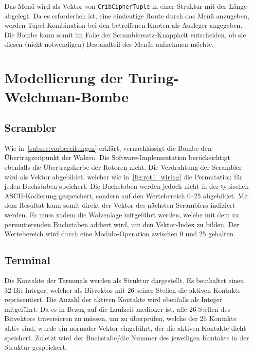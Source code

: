 Das Menü wird als Vektor von \texttt{CribCipherTuple} in einer Struktur mit der Länge abgelegt.
Da es erforderlich ist, eine eindeutige \glqq Route\grqq{} durch das Menü anzugeben, werden Tupel-Kombination bei den betroffenen Knoten als Ausleger angegeben. 
Die Bombe kann somit im Falle der \glqq Scramblersatz-Knappheit\grqq{} entscheiden, ob sie diesen (nicht notwendigen) Bestandteil des Menüs aufnehmen möchte.

\section{Modellierung der Turing-Welchman-Bombe}\label{sec:model}
\subsection{Scrambler}\label{subsec:impl_scrambler}
Wie in~\cref{subsec:vorbereitungen} erklärt, vernachlässigt die Bombe den Übertragzeitpunkt der Walzen.
Die Software-Implementation berücksichtigt ebenfalls die Übertragskerbe der Rotoren nicht.
Die Verdrahtung der Scrambler wird als Vektor abgebildet, welcher wie in~\cref{fig:rot1_wiring} die Permutation für jeden Buchstaben speichert.
Die Buchstaben werden jedoch nicht in der typischen ASCII-Kodierung gespeichert, sondern auf den Wertebereich 0--25 abgebildet.
Mit dem Resultat kann somit direkt der Vektor des nächsten Scramblers indiziert werden.
Es muss zudem die Walzenlage mitgeführt werden, welche mit dem zu permutierenden Buchstaben addiert wird, um den Vektor-Index zu bilden.
Der Wertebereich wird durch eine Modulo-Operation zwischen 0 und 25 gehalten.

\subsection{Terminal}\label{subsec:impl_terminal}
Die Kontakte der Terminals werden als Struktur dargestellt.
Es beinhaltet einen 32 Bit Integer, welcher als Bitvektor mit 26 seiner Stellen die aktiven Kontakte repräsentiert.
Die Anzahl der aktiven Kontakte wird ebenfalls als Integer mitgeführt.
Da es in Bezug auf die Laufzeit medioker ist, alle 26 Stellen des Bitvektors traversieren zu müssen, um zu überprüfen, welche der 26 Kontakte aktiv sind, wurde ein normaler Vektor eingeführt, der die aktiven Kontakte \glqq dicht\grqq{} speichert.
Zuletzt wird der Buchstabe/die Nummer des jeweiligen Kontakts in der Struktur gespeichert.

